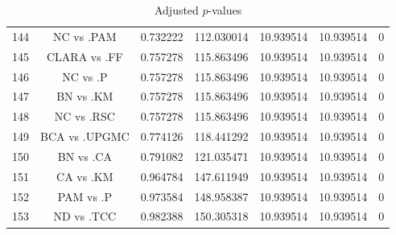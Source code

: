 \documentclass[a4paper,10pt]{article}
\begin{document}
\begin{landscape}
\begin{table}[!htp]
\begin{tabular}{ccccccc}
144&NC vs .PAM&0.732222&112.030014&10.939514&10.939514&0\\
145&CLARA vs .FF&0.757278&115.863496&10.939514&10.939514&0\\
146&NC vs .P&0.757278&115.863496&10.939514&10.939514&0\\
147&BN vs .KM&0.757278&115.863496&10.939514&10.939514&0\\
148&NC vs .RSC&0.757278&115.863496&10.939514&10.939514&0\\
149&BCA vs .UPGMC&0.774126&118.441292&10.939514&10.939514&0\\
150&BN vs .CA&0.791082&121.035471&10.939514&10.939514&0\\
151&CA vs .KM&0.964784&147.611949&10.939514&10.939514&0\\
152&PAM vs .P&0.973584&148.958387&10.939514&10.939514&0\\
153&ND vs .TCC&0.982388&150.305318&10.939514&10.939514&0\\
\hline
\end{tabular}
\caption{Adjusted $p$-values}
\end{table}

\end{landscape}
\end{document}
